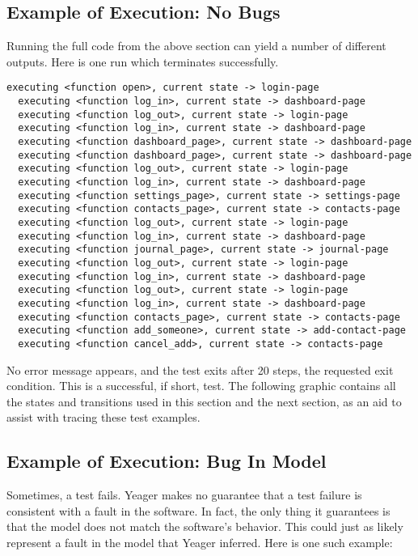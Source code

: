 \subsection{Example of Execution: No Bugs}
Running the full code from the above section can yield a number of different outputs. Here is one run which terminates successfully.

\begin{Verbatim}[fontsize=\small, baselinestretch=0.75]
  executing <function open>, current state -> login-page
  executing <function log_in>, current state -> dashboard-page
  executing <function log_out>, current state -> login-page
  executing <function log_in>, current state -> dashboard-page
  executing <function dashboard_page>, current state -> dashboard-page
  executing <function dashboard_page>, current state -> dashboard-page
  executing <function log_out>, current state -> login-page
  executing <function log_in>, current state -> dashboard-page
  executing <function settings_page>, current state -> settings-page
  executing <function contacts_page>, current state -> contacts-page
  executing <function log_out>, current state -> login-page
  executing <function log_in>, current state -> dashboard-page
  executing <function journal_page>, current state -> journal-page
  executing <function log_out>, current state -> login-page
  executing <function log_in>, current state -> dashboard-page
  executing <function log_out>, current state -> login-page
  executing <function log_in>, current state -> dashboard-page
  executing <function contacts_page>, current state -> contacts-page
  executing <function add_someone>, current state -> add-contact-page
  executing <function cancel_add>, current state -> contacts-page
\end{Verbatim}

No error message appears, and the test exits after 20 steps, the requested exit condition. This is a successful, if short, test. The following graphic contains all the states and transitions used in this section and the next section, as an aid to assist with tracing these test examples.

\noindent{}

\subsection{Example of Execution: Bug In Model}
Sometimes, a test fails. Yeager makes no guarantee that a test failure is consistent with a fault in the software. In fact, the only thing it guarantees is that the model does not match the software's behavior. This could just as likely represent a fault in the model that Yeager inferred. Here is one such example:

